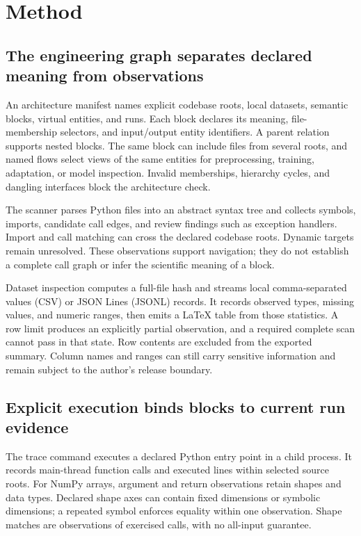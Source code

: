 \section{Method}
\label{sec:method}

\subsection{The engineering graph separates declared meaning from observations}
An architecture manifest names explicit codebase roots, local datasets, semantic blocks, virtual entities, and runs. Each block declares its meaning, file-membership selectors, and input/output entity identifiers. A parent relation supports nested blocks. The same block can include files from several roots, and named flows select views of the same entities for preprocessing, training, adaptation, or model inspection. Invalid memberships, hierarchy cycles, and dangling interfaces block the architecture check.

The scanner parses Python files into an abstract syntax tree and collects symbols, imports, candidate call edges, and review findings such as exception handlers. Import and call matching can cross the declared codebase roots. Dynamic targets remain unresolved. These observations support navigation; they do not establish a complete call graph or infer the scientific meaning of a block.

Dataset inspection computes a full-file hash and streams local comma-separated values (CSV) or JSON Lines (JSONL) records. It records observed types, missing values, and numeric ranges, then emits a LaTeX table from those statistics. A row limit produces an explicitly partial observation, and a required complete scan cannot pass in that state. Row contents are excluded from the exported summary. Column names and ranges can still carry sensitive information and remain subject to the author's release boundary.

\subsection{Explicit execution binds blocks to current run evidence}
The trace command executes a declared Python entry point in a child process. It records main-thread function calls and executed lines within selected source roots. For NumPy arrays, argument and return observations retain shapes and data types. Declared shape axes can contain fixed dimensions or symbolic dimensions; a repeated symbol enforces equality within one observation. Shape matches are observations of exercised calls, with no all-input guarantee.

